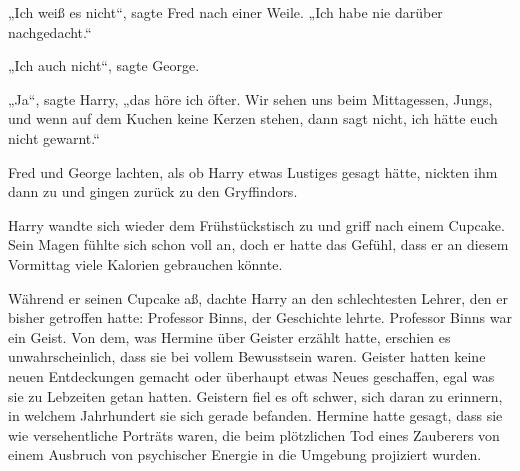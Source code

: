 „Ich weiß es nicht“, sagte Fred nach einer Weile. „Ich habe nie darüber nachgedacht.“ 

„Ich auch nicht“, sagte George. 

„Ja“, sagte Harry, „das höre ich öfter. Wir sehen uns beim Mittagessen, Jungs, und wenn auf dem Kuchen keine Kerzen stehen, dann sagt nicht, ich hätte euch nicht gewarnt.“ 

Fred und George lachten, als ob Harry etwas Lustiges gesagt hätte, nickten ihm dann zu und gingen zurück zu den Gryffindors. 

Harry wandte sich wieder dem Frühstückstisch zu und griff nach einem Cupcake. Sein Magen fühlte sich schon voll an, doch er hatte das Gefühl, dass er an diesem Vormittag viele Kalorien gebrauchen könnte. 

Während er seinen Cupcake aß, dachte Harry an den schlechtesten Lehrer, den er bisher getroffen hatte: Professor Binns, der Geschichte lehrte. Professor Binns war ein Geist. Von dem, was Hermine über Geister erzählt hatte, erschien es unwahrscheinlich, dass sie bei vollem Bewusstsein waren. Geister hatten keine neuen Entdeckungen gemacht oder überhaupt etwas Neues geschaffen, egal was sie zu Lebzeiten getan hatten. Geistern fiel es oft schwer, sich daran zu erinnern, in welchem Jahrhundert sie sich gerade befanden. Hermine hatte gesagt, dass sie wie versehentliche Porträts waren, die beim plötzlichen Tod eines Zauberers von einem Ausbruch von psychischer Energie in die Umgebung projiziert wurden. 

